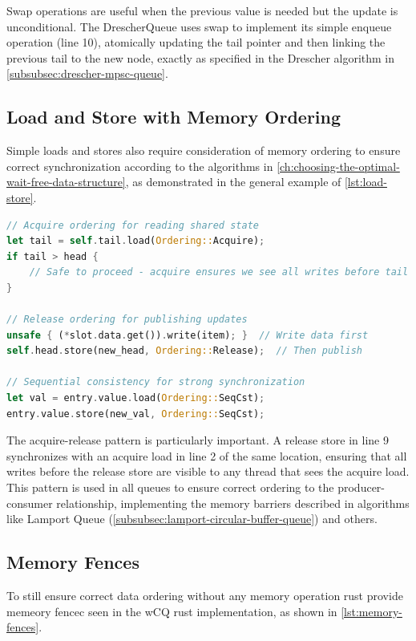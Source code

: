 Swap operations are useful when the previous value is needed but the update is unconditional. The DrescherQueue uses swap to implement its simple enqueue operation (line 10), atomically updating the tail pointer and then linking the previous tail to the new node, exactly as specified in the Drescher algorithm in \cref{subsubsec:drescher-mpsc-queue}.

\subsection{Load and Store with Memory Ordering}

Simple loads and stores also require consideration of memory ordering to ensure correct synchronization according to the algorithms in \cref{ch:choosing-the-optimal-wait-free-data-structure}, as demonstrated in the general example of \cref{lst:load-store}.

\begin{lstlisting}[language=Rust, style=boxed, caption={Memory ordering for loads and stores}, label={lst:load-store}]
// Acquire ordering for reading shared state
let tail = self.tail.load(Ordering::Acquire);
if tail > head {
    // Safe to proceed - acquire ensures we see all writes before tail update
}

// Release ordering for publishing updates
unsafe { (*slot.data.get()).write(item); }  // Write data first
self.head.store(new_head, Ordering::Release);  // Then publish

// Sequential consistency for strong synchronization
let val = entry.value.load(Ordering::SeqCst);
entry.value.store(new_val, Ordering::SeqCst);
\end{lstlisting}

The acquire-release pattern is particularly important. A release store in line 9 synchronizes with an acquire load in line 2 of the same location, ensuring that all writes before the release store are visible to any thread that sees the acquire load. This pattern is used in all queues to ensure correct ordering to the producer-consumer relationship, implementing the memory barriers described in algorithms like Lamport Queue (\cref{subsubsec:lamport-circular-buffer-queue}) and others.

\subsection{Memory Fences}

To still ensure correct data ordering without any memory operation rust provide memeory fencec seen in the \ac{wCQ} rust implementation, as shown in \cref{lst:memory-fences}.

